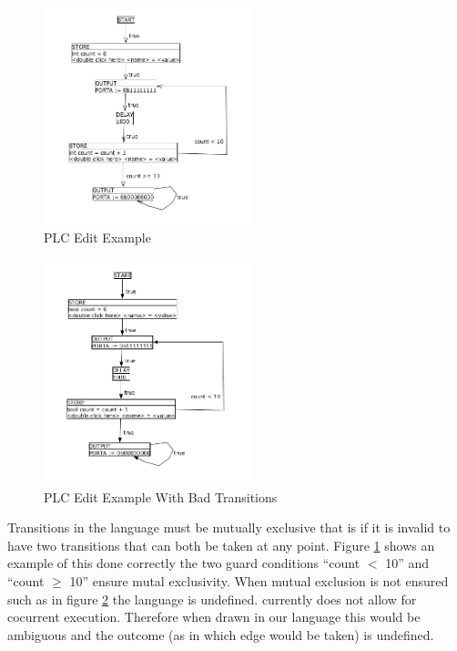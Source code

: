 \begin{figure}[htp]
    \centering
    \includegraphics[width=230px]{./images/tool_transition_example.png}
    \caption{PLC Edit Example}
    \label{fig:tool_transition_example}
\end{figure}

\begin{figure}[htp]
    \centering
    \includegraphics[width=230px]{./images/tool_transition_example_bad.png}
    \caption{PLC Edit Example With Bad Transitions}
    \label{fig:tool_transition_example_bad}
\end{figure}

Transitions in the language must be mutually exclusive that is if it is invalid to have two transitions that can both be taken at any point. Figure \ref{fig:tool_transition_example} shows an example of this done correctly the two guard conditions ``count $<$ 10'' and ``count $\geq$ 10'' ensure mutal exclusivity. When mutual exclusion is not ensured such as in figure \ref{fig:tool_transition_example_bad} the language is undefined. \plccharts currently does not allow for cocurrent execution. Therefore when drawn in our language this would be ambiguous and the outcome (as in which edge would be taken) is undefined.